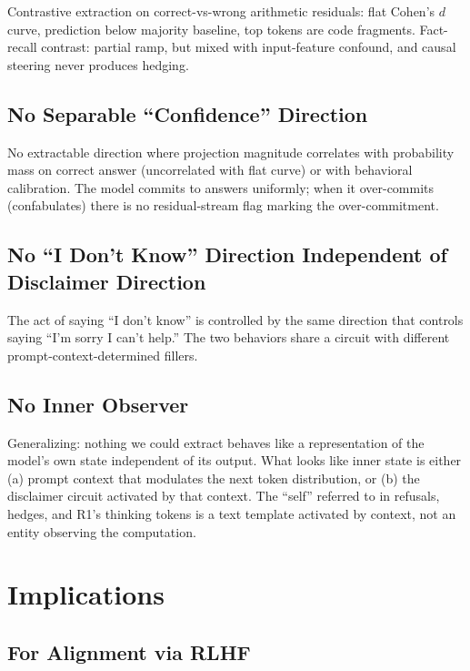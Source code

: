 \documentclass[11pt,a4paper]{article}
\begin{document}
Contrastive extraction on correct-vs-wrong arithmetic residuals: flat Cohen's $d$ curve, prediction below majority baseline, top tokens are code fragments. Fact-recall contrast: partial ramp, but mixed with input-feature confound, and causal steering never produces hedging.

\subsection{No Separable ``Confidence'' Direction}

No extractable direction where projection magnitude correlates with probability mass on correct answer (uncorrelated with flat curve) or with behavioral calibration. The model commits to answers uniformly; when it over-commits (confabulates) there is no residual-stream flag marking the over-commitment.

\subsection{No ``I Don't Know'' Direction Independent of Disclaimer Direction}

The act of saying ``I don't know'' is controlled by the same direction that controls saying ``I'm sorry I can't help.'' The two behaviors share a circuit with different prompt-context-determined fillers.

\subsection{No Inner Observer}

Generalizing: nothing we could extract behaves like a representation of the model's own state independent of its output. What looks like inner state is either (a) prompt context that modulates the next token distribution, or (b) the disclaimer circuit activated by that context. The ``self'' referred to in refusals, hedges, and R1's thinking tokens is a text template activated by context, not an entity observing the computation.

\section{Implications}

\subsection{For Alignment via RLHF}
\end{document}
